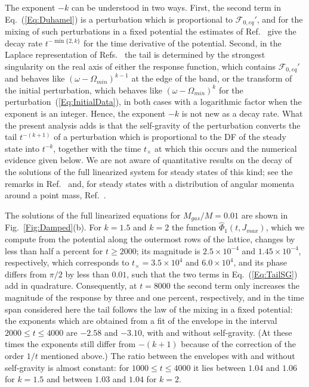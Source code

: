 The exponent $-k$ can be understood in two ways. First, the second term in Eq.~(\ref{Eq:Duhamel}) is a perturbation which is proportional to $\mathcal{F}_{0,eq}'$, and for the mixing of such perturbations in a fixed potential the estimates of Ref.~\cite{mHgRmScS24} give the decay rate $t^{-\min\{ 2,k \}}$ for the time derivative of the potential. Second, in the Laplace representation of Refs.~\cite{jBaOyY11,jByY13} the tail is determined by the strongest singularity on the real axis of either the response function, which contains $\mathcal{F}_{0,eq}'$ and behaves like $(\omega - \Omega_{min})^{k-1}$ at the edge of the band, or the transform of the initial perturbation, which behaves like $(\omega - \Omega_{min})^k$ for the perturbation~(\ref{Eq:InitialData}), in both cases with a logarithmic factor when the exponent is an integer. Hence, the exponent $-k$ is not new as a decay rate. What the present analysis adds is that the self-gravity of the perturbation converts the tail $t^{-(k+1)}$ of a perturbation which is proportional to the DF of the steady state into $t^{-k}$, together with the time $t_\times$ at which this occurs and the numerical evidence given below. We are not aware of quantitative results on the decay of the solutions of the full linearized system for steady states of this kind; see the remarks in Ref.~\cite{cS24} and, for steady states with a distribution of angular momenta around a point mass, Ref.~\cite{mHmS25}. 

The solutions of the full linearized equations for $M_{gas}/M = 0.01$ are shown in Fig.~\ref{Fig:Damped}(b). For $k = 1.5$ and $k = 2$ the function $\hat{\Phi}_1(t,J_{max})$, which we compute from the potential along the outermost rows of the lattice, changes by less than half a percent for $t\geq 2000$; its magnitude is $2.5\times 10^{-4}$ and $1.45\times 10^{-4}$, respectively, which corresponds to $t_\times = 3.5\times 10^4$ and $6.0\times 10^4$, and its phase differs from $\pi/2$ by less than $0.01$, such that the two terms in Eq.~(\ref{Eq:TailSG}) add in quadrature. Consequently, at $t = 8000$ the second term only increases the magnitude of the response by three and one percent, respectively, and in the time span considered here the tail follows the law of the mixing in a fixed potential: the exponents which are obtained from a fit of the envelope in the interval $2000\leq t\leq 4000$ are $-2.58$ and $-3.10$, with and without self-gravity. (At these times the exponents still differ from $-(k+1)$ because of the correction of the order $1/t$ mentioned above.) The ratio between the envelopes with and without self-gravity is almost constant: for $1000\leq t\leq 4000$ it lies between $1.04$ and $1.06$ for $k = 1.5$ and between $1.03$ and $1.04$ for $k = 2$.

